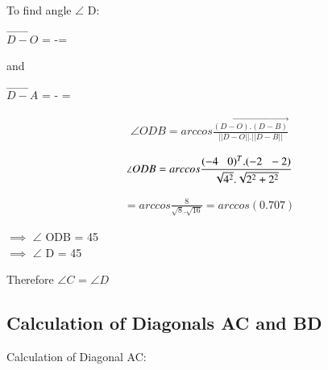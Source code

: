 \documentclass[journal,10pt,twocolumn]{article}
\begin{document}
\begin{flushleft}
\vspace{0.5cm}
\begin{flushleft}
To find angle $\angle$ D: \\
\end{flushleft}
\vspace{0.2cm}
\center
$\vec{D-O}$ = -= 
\\
\endcenter
\begin{flushleft}
and \\
\end{flushleft}


$\vec{D-A}$ =  - = 

\endcenter

\begin{align}
\angle ODB = arccos \vec{\frac{(D-O).(D-B)}{||D-O ||. ||D-B||}}
\end{align}

\begin{align}
\angle ODB = arccos \frac{(-4 \hspace{0.29cm} 0)^T .(-2 \hspace{0.22cm} -2)}{\sqrt{4^2}.\sqrt{2^2+2^2} }
\end{align}

\begin{align}
= arccos \frac{8} {\sqrt{8}.\sqrt{16}} = arccos (0.707)
\end{align}

\begin{flushleft}
$\implies$   $\angle$ ODB = 45 \textdegree\\
\vspace{0.3cm}
$\implies$   $\angle$ D = 45 \textdegree
\end{flushleft}

Therefore $\angle C$ = $\angle D$

\subsection{Calculation of Diagonals AC and BD}
\vspace{0.2cm}
\begin{flushleft}
Calculation of Diagonal AC:\\
\end{flushleft}


\end{flushleft}
\end{document}
